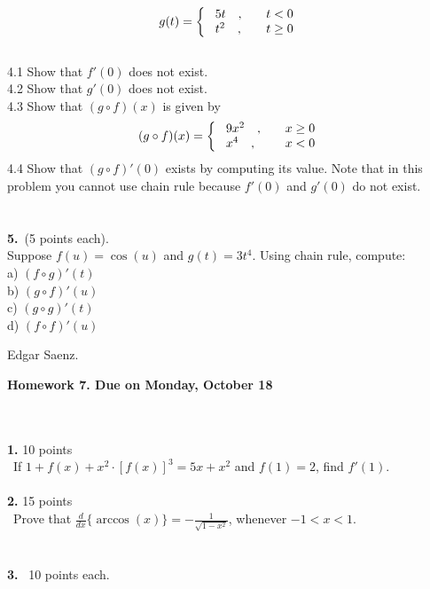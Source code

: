 \documentclass[12pt]{article}
\newcommand{\Frac}{\displaystyle \frac}
\newcommand{\Sqrt}{\displaystyle \sqrt}
\begin{document}
$$g(t)=\left\{ \begin{array}{ll}
              \ 5t \   \    \ ,& \   \   \   \hbox{$ t<0$}
              \\
              \ t^{2}  \   \   \ , & \   \   \   \hbox{$t\geq0$}
                \end{array}
            \right. $$\\
4.1 Show that $f'(0)$ does not exist.\\
4.2 Show that $g'(0)$ does not exist.\\
4.3 Show that $(g\circ f)(x)$ is given by
$$(g\circ f)(x)=\left\{ \begin{array}{ll}
              \ 9x^{2} \   \    \ ,& \   \   \  \hbox{$ x\geq 0$}
              \\
              \ x^{4}  \   \   \ , & \   \   \   \hbox{$x<0$}
                \end{array}
            \right. $$
4.4 Show that $(g\circ f)'(0)$ exists by computing its value. Note that in this problem you cannot use chain rule because $f'(0)$ and $g'(0)$ do not exist.\\
\\
\\
\textbf{5.}\ (5 points each).\\
Suppose $f(u)=\cos(u)$ and $g(t)=3t^{4}$. Using chain rule, compute:\\
a) $(f\circ g)'(t)$\\
b) $(g\circ f)'(u)$\\
c) $(g\circ g)'(t)$\\
d) $(f\circ f)'(u)$\\
\begin{flushright}
Edgar Saenz.
\end{flushright}
\newpage
\begin{center}
\textbf{Homework 7. Due on Monday, October 18} \\
\end{center}\
\\
\\
\textbf{1.} 10 points\\
\  If  $1+f(x)+x^{2}\cdot[f(x)]^{3}=5x+x^{2}$ and $f(1)=2$, find $f'(1).$\\
\\
\textbf{2.} 15 points\\
\  Prove that $\Frac{d}{dx}\{\arccos(x)\}=-\Frac{1}{\Sqrt{1-x^{2}}} $, whenever  $-1<x<1$. 
\\
\\
\\
\textbf{3.} \  10 points each.\\
\end{document}
